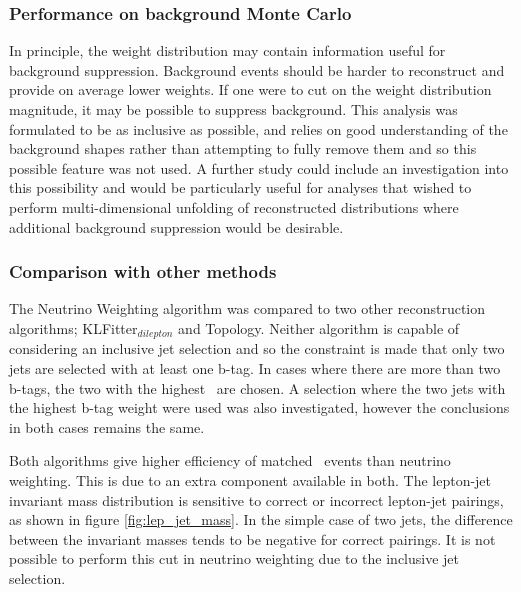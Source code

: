 
\subsubsection{Performance on background Monte Carlo}
In principle, the weight distribution may contain information useful for background suppression. Background events should be harder to reconstruct and provide on average lower weights. If one were to cut on the weight distribution magnitude, it may be possible to suppress background. This analysis was formulated to be as inclusive as possible, and relies on good understanding of the background shapes rather than attempting to fully remove them and so this possible feature was not used. A further study could include an investigation into this possibility and would be particularly useful for analyses that wished to perform multi-dimensional unfolding of reconstructed distributions where additional background suppression would be desirable. 

\subsubsection{Comparison with other methods}
\label{sec:reco_comparison}
The Neutrino Weighting algorithm was compared to two other reconstruction algorithms; KLFitter$_{dilepton}$ and Topology. Neither algorithm is capable of considering an inclusive jet selection and so the constraint is made that only two jets are selected with at least one b-tag. In cases where there are more than two b-tags, the two with the highest \pt\ are chosen. A selection where the two jets with the highest b-tag weight were used was also investigated, however the conclusions in both cases remains the same.

Both algorithms give higher efficiency of matched \ttbar\ events than neutrino weighting. This is due to an extra component available in both. The lepton-jet invariant mass distribution is sensitive to correct or incorrect lepton-jet pairings, as shown in figure \ref{fig:lep_jet_mass}. In the simple case of two jets, the difference between the invariant masses tends to be negative for correct pairings. It is not possible to perform this cut in neutrino weighting due to the inclusive jet selection. 

